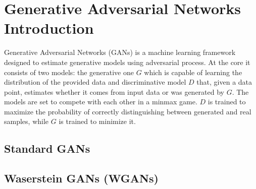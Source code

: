 \chapter{Generative Adversarial Networks Introduction}\label{chapter:gans}
Generative Adversarial Networks (GANs)\cite{goodfellow2014generative} is a
machine learning framework designed to estimate generative models using
adversarial process. At the core it consists of two models: the generative one
$G$ which is capable of learning the distribution of the provided data and
discriminative model $D$ that, given a data point, estimates whether it comes
from input data or was generated by $G$. The models are set to compete with each
other in a minmax game. $D$ is trained to maximize the probability of correctly
distinguishing between generated and real samples, while $G$ is trained to
minimize it.  
\section{Standard GANs}
\section{Waserstein GANs (WGANs)}

